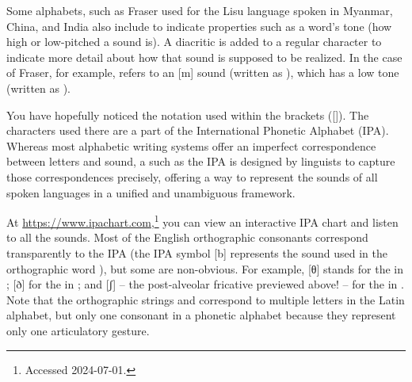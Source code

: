 Some alphabets, such as Fraser used for the Lisu language spoken in
Myanmar, China, and India also include
 to indicate properties such as a
word's tone (how high or low-pitched a sound is).  A diacritic is
added to a regular character to indicate more detail
about how that sound is supposed to be realized.  In the case of
Fraser, for example,  refers to an {[m]} sound
(written as ), which has a low tone (written as \exword{:}).





You have hopefully noticed the notation used within the brackets
({[]}).  The characters used there are a part of the
International Phonetic Alphabet (IPA). Whereas most alphabetic writing systems offer an imperfect correspondence between letters and sound, a  such as the IPA is designed by linguists to capture those correspondences precisely, offering a way to represent the sounds of all spoken languages in a unified and unambiguous framework.


At \url{https://www.ipachart.com},\footnote{Accessed 2024-07-01.} you can view an interactive
IPA chart and listen to all the sounds.
Most of the English orthographic consonants correspond transparently to the IPA (the IPA symbol {[b]} represents the sound used in the orthographic word ), but some are non-obvious.
For example, [θ] stands for the  in
; [ð] for the  in ; and
[ʃ] -- the post-alveolar fricative previewed above! --  for the  in .  Note that the orthographic strings  and  correspond to multiple letters in the Latin alphabet, but only one consonant in a phonetic alphabet because they represent only one articulatory gesture.







